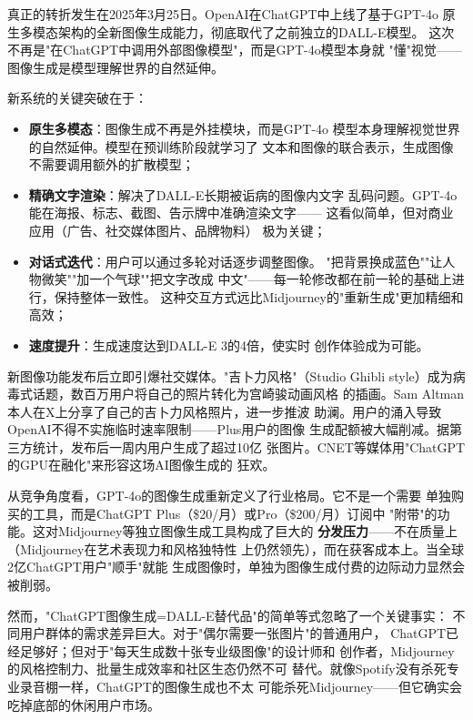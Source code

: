 真正的转折发生在2025年3月25日。OpenAI在ChatGPT中上线了基于GPT-4o
原生多模态架构的全新图像生成能力，彻底取代了之前独立的DALL-E模型。
这次不再是"在ChatGPT中调用外部图像模型"，而是GPT-4o模型本身就
"懂"视觉——图像生成是模型理解世界的自然延伸。

新系统的关键突破在于：
\begin{itemize}
  \item \textbf{原生多模态}：图像生成不再是外挂模块，而是GPT-4o
    模型本身理解视觉世界的自然延伸。模型在预训练阶段就学习了
    文本和图像的联合表示，生成图像不需要调用额外的扩散模型；
  \item \textbf{精确文字渲染}：解决了DALL-E长期被诟病的图像内文字
    乱码问题。GPT-4o能在海报、标志、截图、告示牌中准确渲染文字——
    这看似简单，但对商业应用（广告、社交媒体图片、品牌物料）
    极为关键；
  \item \textbf{对话式迭代}：用户可以通过多轮对话逐步调整图像。
    "把背景换成蓝色""让人物微笑""加一个气球""把文字改成
    中文"——每一轮修改都在前一轮的基础上进行，保持整体一致性。
    这种交互方式远比Midjourney的"重新生成"更加精细和高效；
  \item \textbf{速度提升}：生成速度达到DALL-E 3的4倍，使实时
    创作体验成为可能。
\end{itemize}

新图像功能发布后立即引爆社交媒体。"吉卜力风格"（Studio Ghibli
style）成为病毒式话题，数百万用户将自己的照片转化为宫崎骏动画风格
的插画。Sam Altman本人在X上分享了自己的吉卜力风格照片，进一步推波
助澜。用户的涌入导致OpenAI不得不实施临时速率限制——Plus用户的图像
生成配额被大幅削减。据第三方统计，发布后一周内用户生成了超过10亿
张图片。CNET等媒体用"ChatGPT的GPU在融化"来形容这场AI图像生成的
狂欢。

从竞争角度看，GPT-4o的图像生成重新定义了行业格局。它不是一个需要
单独购买的工具，而是ChatGPT Plus（\$20/月）或Pro（\$200/月）订阅中
"附带"的功能。这对Midjourney等独立图像生成工具构成了巨大的
\textbf{分发压力}——不在质量上（Midjourney在艺术表现力和风格独特性
上仍然领先），而在获客成本上。当全球2亿ChatGPT用户"顺手"就能
生成图像时，单独为图像生成付费的边际动力显然会被削弱。

然而，"ChatGPT图像生成=DALL-E替代品"的简单等式忽略了一个关键事实：
不同用户群体的需求差异巨大。对于"偶尔需要一张图片"的普通用户，
ChatGPT已经足够好；但对于"每天生成数十张专业级图像"的设计师和
创作者，Midjourney的风格控制力、批量生成效率和社区生态仍然不可
替代。就像Spotify没有杀死专业录音棚一样，ChatGPT的图像生成也不太
可能杀死Midjourney——但它确实会吃掉底部的休闲用户市场。

